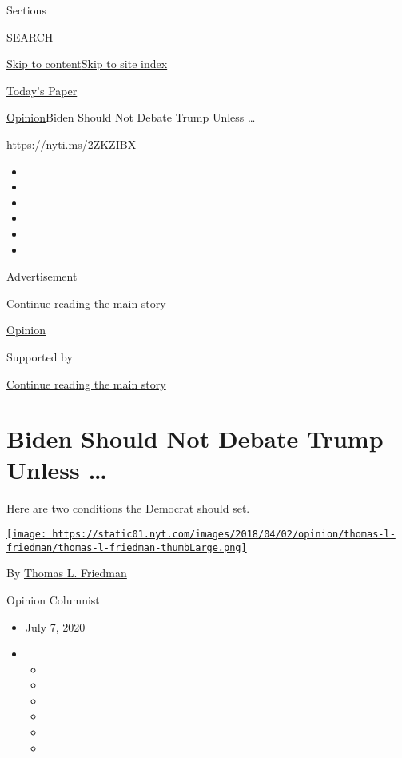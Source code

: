 Sections

SEARCH

\protect\hyperlink{site-content}{Skip to
content}\protect\hyperlink{site-index}{Skip to site index}

\href{https://myaccount.nytimes.com/auth/login?response_type=cookie\&client_id=vi}{}

\href{https://www.nytimes.com/section/todayspaper}{Today's Paper}

\href{/section/opinion}{Opinion}\textbar{}Biden Should Not Debate Trump
Unless \ldots{}

\href{https://nyti.ms/2ZKZIBX}{https://nyti.ms/2ZKZIBX}

\begin{itemize}
\item
\item
\item
\item
\item
\item
\end{itemize}

Advertisement

\protect\hyperlink{after-top}{Continue reading the main story}

\href{/section/opinion}{Opinion}

Supported by

\protect\hyperlink{after-sponsor}{Continue reading the main story}

\hypertarget{biden-should-not-debate-trump-unless-}{%
\section{Biden Should Not Debate Trump Unless
\ldots{}}\label{biden-should-not-debate-trump-unless-}}

Here are two conditions the Democrat should set.

\href{https://www.nytimes.com/by/thomas-l-friedman}{\texttt{[image: https://static01.nyt.com/images/2018/04/02/opinion/thomas-l-friedman/thomas-l-friedman-thumbLarge.png]}}

By \href{https://www.nytimes.com/by/thomas-l-friedman}{Thomas L.
Friedman}

Opinion Columnist

\begin{itemize}
\item
  July 7, 2020
\item
  \begin{itemize}
  \item
  \item
  \item
  \item
  \item
  \item
  \end{itemize}
\end{itemize}

